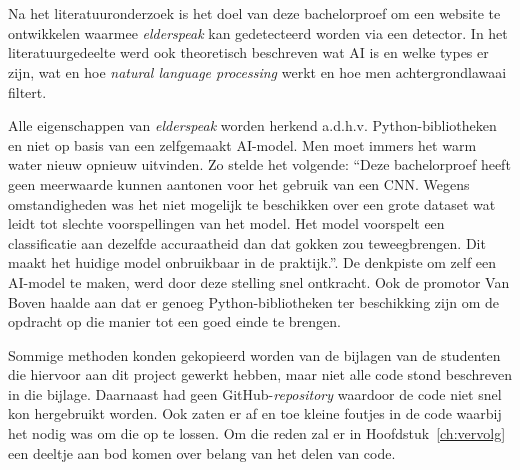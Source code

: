 
\chapter{}
\label{ch:methodologie}


Na het literatuuronderzoek is het doel van deze bachelorproef om een website te ontwikkelen waarmee \textit{elderspeak} kan gedetecteerd worden via een detector. In het literatuurgedeelte werd ook theoretisch beschreven wat AI is en welke types er zijn, wat en hoe \textit{natural language processing} werkt en hoe men achtergrondlawaai filtert.

Alle eigenschappen van \textit{elderspeak} worden herkend a.d.h.v. Python-bibliotheken en niet op basis van een zelfgemaakt AI-model. Men moet immers het warm water nieuw opnieuw uitvinden. Zo stelde \textcite{Beeckman2021} het volgende: ``Deze bachelorproef heeft geen meerwaarde kunnen aantonen voor het gebruik van een CNN. Wegens omstandigheden was het niet mogelijk te beschikken over een grote dataset wat leidt tot slechte voorspellingen van het model. Het model voorspelt een classificatie aan dezelfde accuraatheid dan dat gokken zou teweegbrengen. Dit maakt het huidige model onbruikbaar in de praktijk.''. De denkpiste om zelf een AI-model te maken, werd door deze stelling snel ontkracht. Ook de promotor Van Boven haalde aan dat er genoeg Python-bibliotheken ter beschikking zijn om de opdracht op die manier tot een goed einde te brengen.

Sommige methoden konden gekopieerd worden van de bijlagen van de studenten die hiervoor aan dit project gewerkt hebben, maar niet alle code stond beschreven in die bijlage. Daarnaast had \textcite{Standaert2021} geen GitHub-\textit{repository} waardoor de code niet snel kon hergebruikt worden. Ook zaten er af en toe kleine foutjes in de code waarbij het nodig was om die op te lossen. Om die reden zal er in Hoofdstuk~\ref{ch:vervolg} een deeltje aan bod komen over belang van het delen van code.

